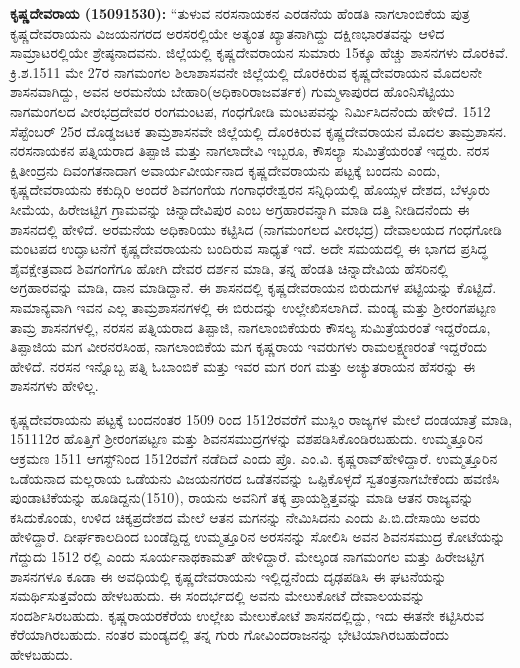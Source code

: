\textbf{ ಕೃಷ್ಣದೇವರಾಯ (1509\general{\enginline{-}}1530):} “ತುಳುವ ನರಸನಾಯಕನ ಎರಡನೆಯ ಹೆಂಡತಿ ನಾಗಲಾಂಬಿಕೆಯ ಪುತ್ರ ಕೃಷ್ಣದೇವರಾಯನು ವಿಜಯನಗರದ ಅರಸರಲ್ಲಿಯೇ ಅತ್ಯಂತ ಖ್ಯಾತನಾಗಿದ್ದು ದಕ್ಷಿಣಭಾರತವನ್ನು ಆಳಿದ ಸಾಮ್ರಾಟರಲ್ಲಿಯೇ ಶ್ರೇಷ್ಠನಾದವನು. ಜಿಲ್ಲೆಯಲ್ಲಿ ಕೃಷ್ಣದೇವರಾಯನ ಸುಮಾರು 15ಕ್ಕೂ ಹೆಚ್ಚು ಶಾಸನಗಳು ದೊರಕಿವೆ. ಕ್ರಿ.ಶ.1511 ಮೇ 27ರ ನಾಗಮಂಗಲ ಶಿಲಾಶಾಸವನೇ ಜಿಲ್ಲೆಯಲ್ಲಿ ದೊರಕಿರುವ ಕೃಷ್ಣದೇವರಾಯನ ಮೊದಲನೇ ಶಾಸನವಾಗಿದ್ದು, ಅವನ ಅರಮನೆಯ ಬೇಹಾರಿ(ಅಧಿಕಾರಿ\enginline{-}ರಾಜವರ್ತಕ) ಗುಮ್ಮಳಾಪುರದ ಹೊಂನಿಸೆಟ್ಟಿಯು ನಾಗಮಂಗಲದ ವೀರಭದ್ರದೇವರ ರಂಗಮಂಟಪ, ಗಂಧಗೋಡಿ ಮಂಟಪವನ್ನು ನಿರ್ಮಿಸಿದನೆಂದು ಹೇಳಿದೆ. 1512 ಸೆಪ್ಟೆಂಬರ್​ 25ರ ದೊಡ್ಡಜಟಕ ತಾಮ್ರಶಾಸನವೇ ಜಿಲ್ಲೆಯಲ್ಲಿ ದೊರಕಿರುವ ಕೃಷ್ಣದೇವರಾಯನ ಮೊದಲ ತಾಮ್ರಶಾಸನ. ನರಸನಾಯಕನ ಪತ್ನಿಯರಾದ ತಿಪ್ಪಾಜಿ ಮತ್ತು ನಾಗಲಾದೇವಿ ಇಬ್ಬರೂ, ಕೌಸಲ್ಯಾ ಸುಮಿತ್ರೆಯರಂತೆ ಇದ್ದರು. ನರಸ ಕ್ಷಿತೀಂದ್ರನು ದಿವಂಗತನಾದಾಗ ಅವಾರ್ಯವೀರ್ಯನಾದ ಕೃಷ್ಣದೇವರಾಯನು ಪಟ್ಟಕ್ಕೆ ಬಂದನು ಎಂದು, ಕೃಷ್ಣದೇವರಾಯನು ಕಕುದ್ಗಿರಿ ಅಂದರೆ ಶಿವಗಂಗೆಯ ಗಂಗಾಧರೇಶ್ವರನ ಸನ್ನಿಧಿಯಲ್ಲಿ ಹೊಯ್ಸಳ ದೇಶದ, ಬೆಳ್ಳೂರು ಸೀಮೆಯ, ಹಿರೇಜಟ್ಟಿಗ ಗ್ರಾಮವನ್ನು ಚಿನ್ನಾದೇವಿಪುರ ಎಂಬ ಅಗ್ರಹಾರವನ್ನಾಗಿ ಮಾಡಿ ದತ್ತಿ ನೀಡಿದನೆಂದು ಈ ಶಾಸನದಲ್ಲಿ ಹೇಳಿದೆ. ಅರಮನೆಯ ಅಧಿಕಾರಿಯು ಕಟ್ಟಿಸಿದ (ನಾಗಮಂಗಲದ ವೀರಭದ್ರ) ದೇವಾಲಯದ ಗಂಧಗೋಡಿ ಮಂಟಪದ ಉದ್ಘಾಟನೆಗೆ ಕೃಷ್ಣದೇವರಾಯನು ಬಂದಿರುವ ಸಾಧ್ಯತೆ ಇದೆ. ಅದೇ ಸಮಯದಲ್ಲಿ ಈ ಭಾಗದ ಪ್ರಸಿದ್ಧ ಶೈವಕ್ಷೇತ್ರವಾದ ಶಿವಗಂಗೆಗೂ ಹೋಗಿ ದೇವರ ದರ್ಶನ ಮಾಡಿ, ತನ್ನ ಹೆಂಡತಿ ಚಿನ್ನಾದೇವಿಯ ಹೆಸರಿನಲ್ಲಿ ಅಗ್ರಹಾರವನ್ನು ಮಾಡಿ, ದಾನ ಮಾಡಿದ್ದಾನೆ. ಈ ಶಾಸನದಲ್ಲಿ ಕೃಷ್ಣದೇವರಾಯನ ಬಿರುದುಗಳ ಪಟ್ಟಿಯನ್ನು ಕೊಟ್ಟಿದೆ. ಸಾಮಾನ್ಯವಾಗಿ ಇವನ ಎಲ್ಲ ತಾಮ್ರಶಾಸನಗಳಲ್ಲಿ ಈ ಬಿರುದನ್ನು ಉಲ್ಲೇಖಿಸಲಾಗಿದೆ. ಮಂಡ್ಯ ಮತ್ತು ಶ‍್ರೀರಂಗಪಟ್ಟಣ ತಾಮ್ರ ಶಾಸನಗಳಲ್ಲಿ, ನರಸನ ಪತ್ನಿಯರಾದ ತಿಪ್ಪಾಜಿ, ನಾಗಲಾಂಬಿಕೆಯರು ಕೌಸಲ್ಯ ಸುಮಿತ್ರೆಯರಂತೆ ಇದ್ದರೆಂದೂ, ತಿಪ್ಪಾಜಿಯ ಮಗ ವೀರನರಸಿಂಹ, ನಾಗಲಾಂಬಿಕೆಯ ಮಗ ಕೃಷ್ಣರಾಯ ಇವರುಗಳು ರಾಮಲಕ್ಷ್ಮಣರಂತೆ ಇದ್ದರೆಂದು ಹೇಳಿದೆ. ನರಸನ ಇನ್ನೊಬ್ಬ ಪತ್ನಿ ಓಬಾಂಬಿಕೆ ಮತ್ತು ಇವರ ಮಗ ರಂಗ ಮತ್ತು ಅಚ್ಯುತರಾಯನ ಹೆಸರನ್ನು ಈ ಶಾಸನಗಳು ಹೇಳಿಲ್ಲ.

ಕೃಷ್ಣದೇವರಾಯನು ಪಟ್ಟಕ್ಕೆ ಬಂದನಂತರ 1509 ರಿಂದ 1512ರವರೆಗೆ ಮುಸ್ಲಿಂ ರಾಜ್ಯಗಳ ಮೇಲೆ ದಂಡಯಾತ್ರೆ ಮಾಡಿ, 1511\enginline{-}12ರ ಹೊತ್ತಿಗೆ ಶ‍್ರೀರಂಗಪಟ್ಟಣ ಮತ್ತು ಶಿವನಸಮುದ್ರಗಳನ್ನು ವಶಪಡಿಸಿಕೊಂಡಿರಬಹುದು. ಉಮ್ಮತ್ತೂರಿನ ಆಕ್ರಮಣ 1511 ಆಗಸ್ಟ್​ನಿಂದ 1512ರವೆಗೆ ನಡೆದಿದೆ ಎಂದು ಪ್ರೊ. ಎಂ.ವಿ. ಕೃಷ್ಣರಾವ್​ ಹೇಳಿದ್ದಾರೆ. ಉಮ್ಮತ್ತೂರಿನ ಒಡೆಯನಾದ ಮಲ್ಲರಾಯ ಒಡೆಯನು ವಿಜಯನಗರದ ಒಡೆತನವನ್ನು ಒಪ್ಪಿಕೊಳ್ಳದೆ ಸ್ವತಂತ್ರನಾಗಬೇಕೆಂದು ಹವಣಿಸಿ ಪುಂಡಾಟಿಕೆಯನ್ನು ಹೂಡಿದ್ದನು(1510), ರಾಯನು ಅವನಿಗೆ ತಕ್ಕ ಪ್ರಾಯಶ್ಚಿತ್ತವನ್ನು ಮಾಡಿ ಆತನ ರಾಜ್ಯವನ್ನು ಕಸಿದು\-ಕೊಂಡು, ಉಳಿದ ಚಿಕ್ಕಪ್ರದೇಶದ ಮೇಲೆ ಆತನ ಮಗನನ್ನು ನೇಮಿಸಿದನು ಎಂದು ಪಿ.ಬಿ.ದೇಸಾಯಿ ಅವರು ಹೇಳಿದ್ದಾರೆ. ದೀರ್ಘಕಾಲದಿಂದ ಬಂಡೆದ್ದಿದ್ದ ಉಮ್ಮತ್ತೂರಿನ ಅರಸನನ್ನು ಸೋಲಿಸಿ ಅವನ ಶಿವನಸಮುದ್ರ ಕೋಟೆಯನ್ನು ಗೆದ್ದುದು 1512 ರಲ್ಲಿ ಎಂದು ಸೂರ್ಯನಾಥಕಾಮತ್​ ಹೇಳಿದ್ದಾರೆ. ಮೇಲ್ಕಂಡ ನಾಗಮಂಗಲ ಮತ್ತು ಹಿರೇಜಟ್ಟಿಗ ಶಾಸನಗಳೂ ಕೂಡಾ ಈ ಅವಧಿಯಲ್ಲಿ ಕೃಷ್ಣದೇವರಾಯನು ಇಲ್ಲಿದ್ದನೆಂದು ದೃಢಪಡಿಸಿ ಈ ಘಟನೆಯನ್ನು ಸಮರ್ಥಿಸುತ್ತವೆಂದು ಹೇಳಬಹುದು. ಈ ಸಂದರ್ಭದಲ್ಲಿ ಅವನು ಮೇಲುಕೋಟೆ ದೇವಾಲಯವನ್ನು ಸಂದರ್ಶಿಸಿರಬಹುದು. ಕೃಷ್ಣರಾಯರಕೆರೆಯ ಉಲ್ಲೇಖ ಮೇಲುಕೋಟೆ ಶಾಸನದಲ್ಲಿದ್ದು, ಇದು ಈತನೇ ಕಟ್ಟಿಸಿರುವ ಕೆರೆಯಾಗಿರಬಹುದು. ನಂತರ ಮಂಡ್ಯದಲ್ಲಿ ತನ್ನ ಗುರು ಗೋವಿಂದರಾಜನನ್ನು ಭೇಟಿಯಾಗಿರಬಹುದೆಂದು ಹೇಳಬಹುದು.

